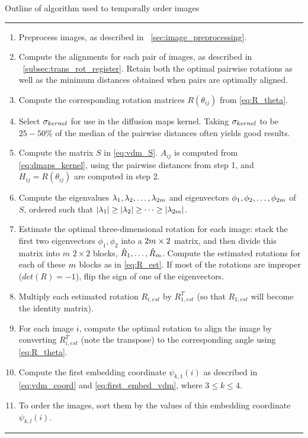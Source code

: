 \begin{table}[t]
\caption{Outline of algorithm used to temporally order images}
\hrule
\begin{enumerate}
\item Preprocess images, as described in \sec~\ref{sec:image_preprocessing}.
%
\item Compute the alignments for each pair of images, as described in \sec~\ref{subsec:trans_rot_register}.
Retain both the optimal pairwise rotations as well as the minimum distances obtained when pairs are optimally aligned.
%
\item Compute the corresponding rotation matrices $R(\theta_{ij})$ from \eqref{eq:R_theta}.
%
\item Select $\sigma_{kernel}$ for use in the diffusion maps kernel. 
%
Taking $\sigma_{kernel}$ to be $25-50\%$ of the median of the pairwise distances often yields good results. 
\item Compute the matrix $S$ in \eqref{eq:vdm_S}. 
$A_{ij}$ is computed from \eqref{eq:dmaps_kernel}, using the pairwise distances from step 1, and $H_{ij} = R(\theta_{ij})$ are computed in step 2.
%
\item Compute the eigenvalues  $\lambda_1, \lambda_2, \dots, \lambda_{2 m}$ and eigenvectors $\phi_1, \phi_2, \dots, \phi_{2 m}$ of $S$, ordered such that $|\lambda_1| \ge |\lambda_2| \ge \dots \ge |\lambda_{2 m}|$.
%
\item Estimate the optimal three-dimensional rotation for each image: stack the first two eigenvectors $\phi_1, \phi_2$ into a $2 m \times 2$ matrix, and then divide this matrix into $m$ $2 \times 2$ blocks, $\hat{R}_1, \dots, \hat{R}_m$. Compute the estimated rotations for each of these $m$ blocks as in \eqref{eq:R_est}. If most of the rotations are improper ($det(R) = -1$), flip the sign of one of the eigenvectors.
\item Multiply each estimated rotation $R_{i, est}$ by $R_{1, est}^T$ (so that $R_{1, est}$ will become the identity matrix).
\item For each image $i$, compute the optimal rotation to align the image by converting $R_{i, est}^T$ (note the transpose) to the corresponding angle using \eqref{eq:R_theta}. 
\item Compute the first embedding coordinate $\psi_{k,1}(i)$ as described in \eqref{eq:vdm_coord} and \eqref{eq:first_embed_vdm}, where $3 \le k \le 4$.
\item To order the images, sort them by the values of this embedding coordinate $\psi_{k,l}(i)$.
\end{enumerate} 
\hrule
\end{table}

